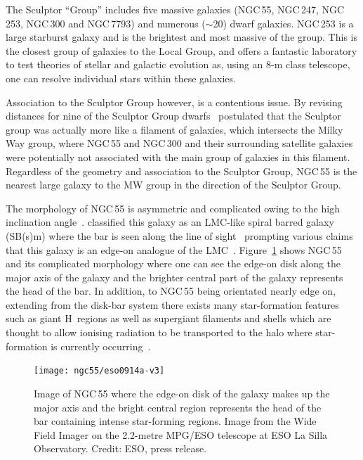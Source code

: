 The Sculptor ``Group'' includes five massive galaxies (NGC\,55, NGC\,247, NGC\,253, NGC\,300 and NGC\,7793) and numerous ($\sim$20) dwarf galaxies.
NGC\,253 is a large starburst galaxy and is the brightest and most massive of the group. This is the closest group of galaxies to the Local Group, and offers a fantastic laboratory to test theories of stellar and galactic evolution as, using an 8-m class telescope, one can resolve individual stars within these galaxies.

Association to the Sculptor Group however, is a contentious issue.
By revising distances for nine of the Sculptor Group dwarfs~\cite{2003A&A...404...93K} postulated that the Sculptor group was actually more like a filament of galaxies, which intersects the Milky Way group, where NGC\,55 and NGC\,300 and their surrounding satellite galaxies were potentially not associated with the main group of galaxies in this filament.
Regardless of the geometry and association to the Sculptor Group, NGC\,55 is the nearest large galaxy to the MW group in the direction of the Sculptor Group.

The morphology of NGC\,55 is asymmetric and complicated owing to the high inclination angle~\cite[up to 80\textdegree;][]{1986A&A...166...97H,2013MNRAS.434.3511W}.
\cite{1961ApJ...133..405D} classified this galaxy as an LMC-like spiral barred galaxy (SB(s)m) where the bar is seen along the line of sight~\cite{1961ApJ...133..405D}
prompting various claims that this galaxy is an edge-on analogue of the LMC~\citep[e.g.][although not cited heavily -- two citations in 50 years -- the idea has propagated]{1964IAUS...20..276R}.
Figure~\ref{fig:ngc55-wide} shows NGC\,55 and its complicated morphology where one can see the edge-on disk along the major axis of the galaxy and the brighter central part of the galaxy represents the head of the bar.
In addition, to NGC\,55 being orientated nearly edge on, extending from the disk-bar system there exists many star-formation features such as giant H\,\2 regions as well as supergiant filaments and shells which are thought to allow ionising radiation to be transported to the halo where star-formation is currently occurring~\citep{1996AJ....112.2567F}.

\begin{figure}
 \centering
 \texttt{[image: ngc55/eso0914a-v3]}
 \caption[Image of NGC\,55]{Image of NGC\,55 where the edge-on disk of the galaxy makes up the major axis and the bright central region represents the head of the bar containing intense star-forming regions.
 Image from the Wide Field Imager on the 2.2-metre MPG/ESO telescope at ESO La Silla Observatory. Credit: ESO, press release.}
 \label{fig:ngc55-wide}
\end{figure}



